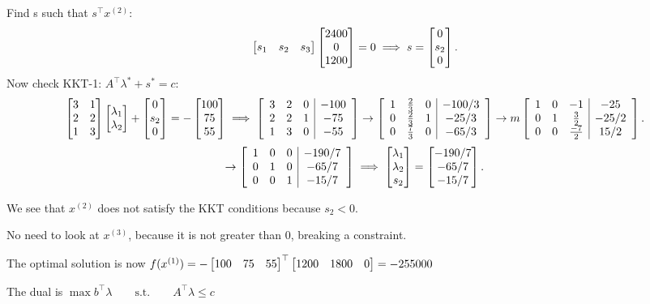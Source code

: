 \medskip Find s such that $s^{\top}x^{(2)}$:
\[
  \M{s_1 & s_2 & s_3}\M{2400 \\ 0 \\ 1200} = 0 \implies s = \M{0 \\ s_2 \\ 0}
.\] 
Now check KKT-1: $A^{\top}\lambda^*+s^* = c$: 
\[
  \M{3 & 1 \\ 2 & 2 \\ 1 & 3}\M{\lambda_1 \\ \lambda_2}+ \M{0 \\ s_2 \\ 0} = - \M{100 \\ 75 \\ 55} \implies \MGJ{ccc|c}{3 & 2 & 0 & -100 \\ 2 & 2 & 1 & -75 \\ 1 & 3 & 0 & -55} 
  \rightarrow \MGJ{ccc|c}{1 & \frac{2}{3} & 0 & -100 / 3 \\ 0 & \frac{2}{3} & 1 & -25 /3 \\ 0 & \frac{7}{3} & 0 & -65 /3 }
  \rightarrow m\MGJ{ccc|c}{1 & 0 & -1 & -25 \\ 0 & 1 & \frac{3}{2} & -25 /2  \\ 0 & 0 & \frac{-7}{2} & 15 /2}
.\] 
\[
  \rightarrow \MGJ{ccc|c}{1 & 0 & 0 & -190 / 7 \\ 0 & 1 & 0 & -65 / 7 \\ 0 & 0 & 1 & -15 /7}
  \implies \M{\lambda_1 \\ \lambda_2 \\ s_2} = \M{-190 / 7\\ -65 /7 \\ -15 / 7}
.\] 

We see that $x^{(2)}$ does not satisfy the KKT conditions because $s_2 < 0$. 

\medskip No need to look at $x^{(3)}$, because it is not greater than 0, breaking a constraint. 

The optimal solution is now $f(x^{(1)}) = -\M{100 & 75 & 55}^{\top}\M{1200 & 1800 & 0} = -255000$


The dual is $\max b^{\top}\lambda\qquad\text{s.t.}\qquad A^{\top}\lambda \leq c$


